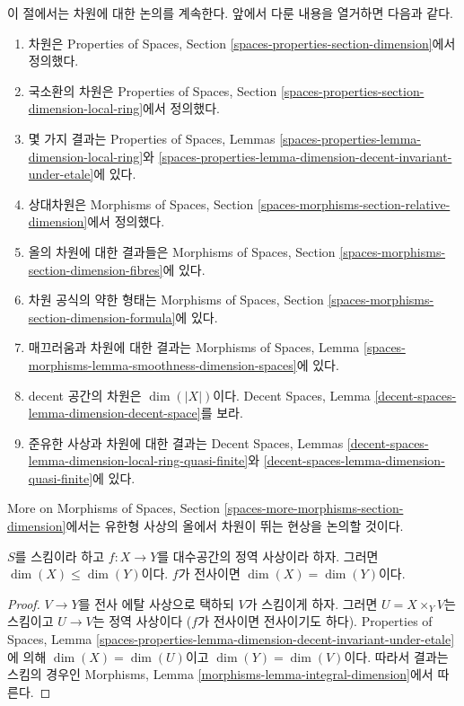 \noindent
이 절에서는 차원에 대한 논의를 계속한다. 앞에서 다룬 내용을 열거하면 다음과
같다.
\begin{enumerate}
\item 차원은 Properties of Spaces, Section
\ref{spaces-properties-section-dimension}에서 정의했다.
\item 국소환의 차원은 Properties of Spaces, Section
\ref{spaces-properties-section-dimension-local-ring}에서 정의했다.
\item 몇 가지 결과는 Properties of Spaces, Lemmas
\ref{spaces-properties-lemma-dimension-local-ring}와
\ref{spaces-properties-lemma-dimension-decent-invariant-under-etale}에 있다.
\item 상대차원은 Morphisms of Spaces, Section
\ref{spaces-morphisms-section-relative-dimension}에서 정의했다.
\item 올의 차원에 대한 결과들은 Morphisms of Spaces, Section
\ref{spaces-morphisms-section-dimension-fibres}에 있다.
\item 차원 공식의 약한 형태는 Morphisms of Spaces, Section
\ref{spaces-morphisms-section-dimension-formula}에 있다.
\item 매끄러움과 차원에 대한 결과는 Morphisms of Spaces, Lemma
\ref{spaces-morphisms-lemma-smoothness-dimension-spaces}에 있다.
\item decent 공간의 차원은 $\dim(|X|)$이다. Decent Spaces, Lemma
\ref{decent-spaces-lemma-dimension-decent-space}를 보라.
\item 준유한 사상과 차원에 대한 결과는 Decent Spaces, Lemmas
\ref{decent-spaces-lemma-dimension-local-ring-quasi-finite}와
\ref{decent-spaces-lemma-dimension-quasi-finite}에 있다.
\end{enumerate}
More on Morphisms of Spaces, Section
\ref{spaces-more-morphisms-section-dimension}에서는 유한형 사상의 올에서 차원이
뛰는 현상을 논의할 것이다.

\begin{lemma}
\label{lemma-integral-dimension}
$S$를 스킴이라 하고 $f : X \to Y$를 대수공간의 정역 사상이라 하자. 그러면
$\dim(X) \leq \dim(Y)$이다. $f$가 전사이면
$\dim(X) = \dim(Y)$이다.
\end{lemma}

\begin{proof}
$V \to Y$를 전사 에탈 사상으로 택하되 $V$가 스킴이게 하자. 그러면
$U = X \times_Y V$는 스킴이고 $U \to V$는 정역 사상이다
($f$가 전사이면 전사이기도 하다). Properties of Spaces, Lemma
\ref{spaces-properties-lemma-dimension-decent-invariant-under-etale}에 의해
$\dim(X) = \dim(U)$이고 $\dim(Y) = \dim(V)$이다. 따라서 결과는 스킴의
경우인 Morphisms, Lemma \ref{morphisms-lemma-integral-dimension}에서
따른다.
\end{proof}

